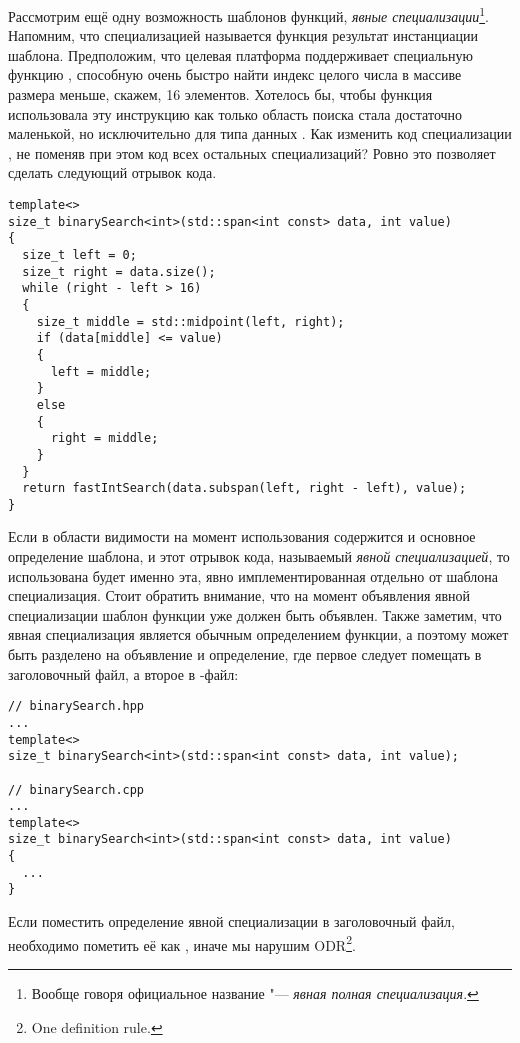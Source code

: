 Рассмотрим ещё одну возможность шаблонов функций, \textit{явные специализации}\footnote{Вообще говоря официальное название "--- \textit{явная полная специализация}.}.
Напомним, что специализацией называется функция результат инстанциации шаблона.
Предположим, что целевая платформа поддерживает специальную функцию , способную очень быстро найти индекс целого числа в массиве размера меньше, скажем, 16 элементов.
Хотелось бы, чтобы функция  использовала эту инструкцию как только область поиска стала достаточно маленькой, но исключительно для типа данных .
Как изменить код специализации , не поменяв при этом код всех остальных специализаций? Ровно это позволяет сделать следующий отрывок кода.
\begin{verbatim}
template<>
size_t binarySearch<int>(std::span<int const> data, int value)
{
  size_t left = 0;
  size_t right = data.size();
  while (right - left > 16)
  {
    size_t middle = std::midpoint(left, right);
    if (data[middle] <= value)
    {
      left = middle;
    }
    else
    {
      right = middle;
    }
  }
  return fastIntSearch(data.subspan(left, right - left), value);
}
\end{verbatim}
Если в области видимости на момент использования  содержится и основное определение шаблона, и этот отрывок кода, называемый \textit{явной специализацией}, то использована будет именно эта, явно имплементированная отдельно от шаблона специализация.
Стоит обратить внимание, что на момент объявления явной специализации шаблон функции уже должен быть объявлен.
Также заметим, что явная специализация является обычным определением функции, а поэтому может быть разделено на объявление и определение, где первое следует помещать в заголовочный файл, а второе в -файл:
\begin{verbatim}
// binarySearch.hpp
...
template<>
size_t binarySearch<int>(std::span<int const> data, int value);

// binarySearch.cpp
...
template<>
size_t binarySearch<int>(std::span<int const> data, int value)
{
  ...
}
\end{verbatim}
Если поместить определение явной специализации в заголовочный файл, необходимо пометить её как , иначе мы нарушим ODR\footnote{One definition rule.}.

